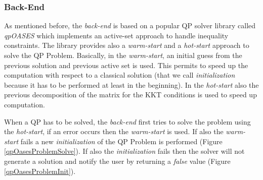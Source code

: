 \subsubsection{Back-End}
As mentioned before, the \emph{back-end} is based on a popular QP solver library called \emph{qpOASES} \cite{ferreau2013} which implements an active-set approach to handle inequality constraints. The library provides also a \emph{warm-start} and a \emph{hot-start} approach to solve the QP Problem. Basically, in the \emph{warm-start}, an initial guess from the previous solution and previous active set is used. This permits to speed up the computation with respect to a classical solution (that we call \emph{initialization} because it has to be performed at least in the beginning).
In the \emph{hot-start} also the previous decomposition of the matrix for the KKT conditions is used to speed up computation. 


When a QP has to be solved, the \emph{back-end} first tries to solve the problem using the \emph{hot-start}, if an error occurs then the \emph{warm-start} is used. If also the \emph{warm-start} fails a new \emph{initialization} of the QP Problem is performed (Figure \ref{qpOasesProblemSolve}). If also the \emph{initialization} fails then the solver will not generate a solution and notify the user by returning a \emph{false} value (Figure \ref{qpOasesProblemInit}).



